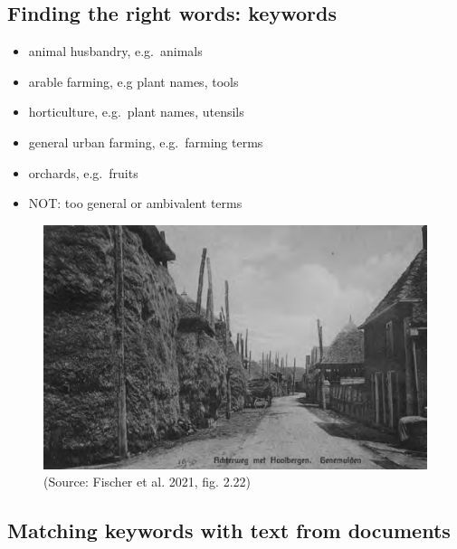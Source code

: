 \documentclass[
  letterpaper,
  DIV=11,
  numbers=noendperiod]{scrartcl}
\begin{document}
\hypertarget{finding-the-right-words-keywords}{%
\subsection{Finding the right words:
keywords}\label{finding-the-right-words-keywords}}

\begin{itemize}
\item
  animal husbandry, e.g.~animals
\item
  arable farming, e.g plant names, tools
\item
  horticulture, e.g.~plant names, utensils
\item
  general urban farming, e.g.~farming terms
\item
  orchards, e.g.~fruits
\item
  NOT: too general or ambivalent terms
\end{itemize}

\begin{figure}

{\centering \includegraphics{images/Figure_2.22_Genemuiden.png}

}

\caption{(Source: Fischer et al. 2021, fig. 2.22)}

\end{figure}

\hypertarget{matching-keywords-with-text-from-documents}{%
\subsection{Matching keywords with text from
documents}\label{matching-keywords-with-text-from-documents}}
\end{document}
